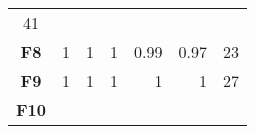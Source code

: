 \documentclass[12pt,a4paper]{article}
\begin{document}
\begin{longtable}[c]{@{}crrrrrr@{}}
\begin{minipage}[t]{0.07\columnwidth}
41
\strut\end{minipage}\tabularnewline
\begin{minipage}[t]{0.11\columnwidth}\centering\strut
\textbf{F8}
\strut\end{minipage} &
\begin{minipage}[t]{0.07\columnwidth}\raggedleft\strut
1
\strut\end{minipage} &
\begin{minipage}[t]{0.08\columnwidth}\raggedleft\strut
1
\strut\end{minipage} &
\begin{minipage}[t]{0.09\columnwidth}\raggedleft\strut
1
\strut\end{minipage} &
\begin{minipage}[t]{0.10\columnwidth}\raggedleft\strut
0.99
\strut\end{minipage} &
\begin{minipage}[t]{0.11\columnwidth}\raggedleft\strut
0.97
\strut\end{minipage} &
\begin{minipage}[t]{0.07\columnwidth}\raggedleft\strut
23
\strut\end{minipage}\tabularnewline
\begin{minipage}[t]{0.11\columnwidth}\centering\strut
\textbf{F9}
\strut\end{minipage} &
\begin{minipage}[t]{0.07\columnwidth}\raggedleft\strut
1
\strut\end{minipage} &
\begin{minipage}[t]{0.08\columnwidth}\raggedleft\strut
1
\strut\end{minipage} &
\begin{minipage}[t]{0.09\columnwidth}\raggedleft\strut
1
\strut\end{minipage} &
\begin{minipage}[t]{0.10\columnwidth}\raggedleft\strut
1
\strut\end{minipage} &
\begin{minipage}[t]{0.11\columnwidth}\raggedleft\strut
1
\strut\end{minipage} &
\begin{minipage}[t]{0.07\columnwidth}\raggedleft\strut
27
\strut\end{minipage}\tabularnewline
\begin{minipage}[t]{0.11\columnwidth}\centering\strut
\textbf{F10}
\strut\end{minipage} &
\begin{minipage}[t]{0.07\columnwidth}\raggedleft\strut

\end{minipage}
\end{longtable}
\end{document}
